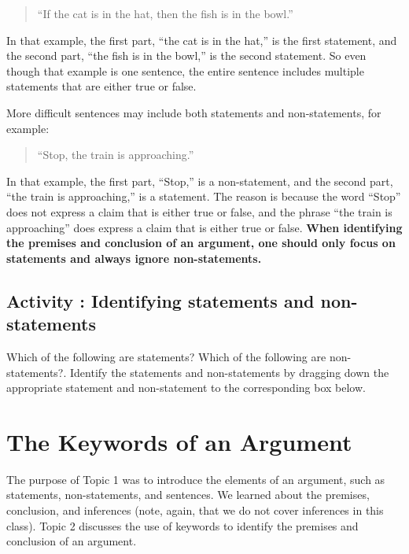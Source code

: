 \documentclass[
]{book}
\begin{document}
\begin{quote}
``If the cat is in the hat, then the fish is in the bowl.''
\end{quote}

In that example, the first part, ``the cat is in the hat,'' is the first statement, and the second part, ``the fish is in the bowl,'' is the second statement. So even though that example is one sentence, the entire sentence includes multiple statements that are either true or false.

More difficult sentences may include both statements and non-statements, for example:

\begin{quote}
``Stop, the train is approaching.''
\end{quote}

In that example, the first part, ``Stop,'' is a non-statement, and the second part, ``the train is approaching,'' is a statement. The reason is because the word ``Stop'' does not express a claim that is either true or false, and the phrase ``the train is approaching'' does express a claim that is either true or false. \textbf{When identifying the premises and conclusion of an argument, one should only focus on statements and always ignore non-statements.}

\hypertarget{activity-identifying-statements-and-non-statements}{%
\subsection*{Activity : Identifying statements and non-statements}\label{activity-identifying-statements-and-non-statements}}

\begin{reflect}
Which of the following are statements? Which of the following are non-statements?. Identify the statements and non-statements by dragging down the appropriate statement and non-statement to the corresponding box below.
\end{reflect}

\hypertarget{the-keywords-of-an-argument}{%
\section{The Keywords of an Argument}\label{the-keywords-of-an-argument}}

The purpose of Topic 1 was to introduce the elements of an argument, such as statements, non-statements, and sentences. We learned about the premises, conclusion, and inferences (note, again, that we do not cover inferences in this class). Topic 2 discusses the use of keywords to identify the premises and conclusion of an argument.
\end{document}
